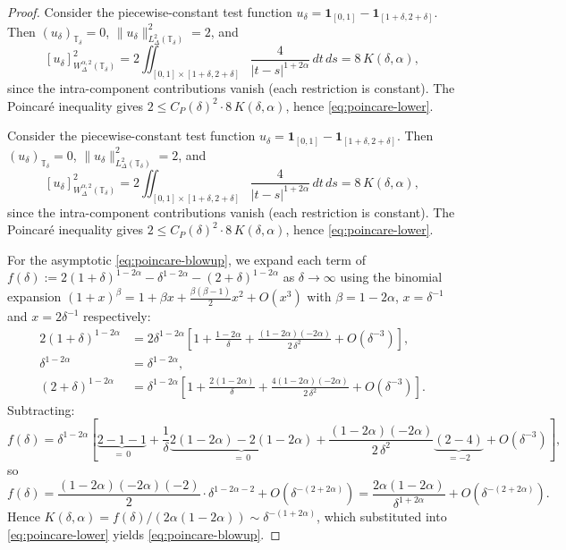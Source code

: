 \documentclass[11pt,a4paper]{article}
\numberwithin{equation}{section}
\theoremstyle{definition}
\newcommand{\T}{\mathbb{T}}
\begin{document}
\begin{proof}
Consider the piecewise-constant test function
$u_\delta = \mathbf{1}_{[0,1]} - \mathbf{1}_{[1+\delta,2+\delta]}$.
Then $(u_\delta)_{\T_\delta}=0$,
$\|u_\delta\|^2_{L^2_\Delta(\T_\delta)}=2$, and
\[
[u_\delta]^2_{W^{\alpha,2}_\Delta(\T_\delta)}
= 2\iint_{[0,1]\times[1+\delta,2+\delta]}
\frac{4}{|t-s|^{1+2\alpha}}\,dt\,ds
= 8\,K(\delta,\alpha),
\]
since the intra-component contributions vanish (each
restriction is constant). The Poincar\'e inequality gives
$2 \le C_P(\delta)^2 \cdot 8\,K(\delta,\alpha)$, hence
\eqref{eq:poincare-lower}.

Consider the piecewise-constant test function
$u_\delta = \mathbf{1}_{[0,1]} - \mathbf{1}_{[1+\delta,2+\delta]}$.
Then $(u_\delta)_{\T_\delta}=0$,
$\|u_\delta\|^2_{L^2_\Delta(\T_\delta)}=2$, and
\[
[u_\delta]^2_{W^{\alpha,2}_\Delta(\T_\delta)}
= 2\iint_{[0,1]\times[1+\delta,2+\delta]}
\frac{4}{|t-s|^{1+2\alpha}}\,dt\,ds
= 8\,K(\delta,\alpha),
\]
since the intra-component contributions vanish (each
restriction is constant). The Poincar\'e inequality gives
$2 \le C_P(\delta)^2 \cdot 8\,K(\delta,\alpha)$, hence
\eqref{eq:poincare-lower}.

For the asymptotic \eqref{eq:poincare-blowup}, we expand each term of
$f(\delta):=2(1+\delta)^{1-2\alpha}-\delta^{1-2\alpha}-(2+\delta)^{1-2\alpha}$
as $\delta\to\infty$ using the binomial expansion
$(1+x)^\beta = 1 + \beta x + \tfrac{\beta(\beta-1)}{2}x^2 + O(x^3)$
with $\beta=1-2\alpha$, $x=\delta^{-1}$ and $x=2\delta^{-1}$ respectively:
\begin{align*}
2(1+\delta)^{1-2\alpha}
&= 2\delta^{1-2\alpha}
  \!\left[1 + \frac{1-2\alpha}{\delta}
   + \frac{(1-2\alpha)(-2\alpha)}{2\,\delta^2}
   + O(\delta^{-3})\right],\\
\delta^{1-2\alpha}
&= \delta^{1-2\alpha},\\
(2+\delta)^{1-2\alpha}
&= \delta^{1-2\alpha}
  \!\left[1 + \frac{2(1-2\alpha)}{\delta}
   + \frac{4(1-2\alpha)(-2\alpha)}{2\,\delta^2}
   + O(\delta^{-3})\right].
\end{align*}
Subtracting:
\[
f(\delta)
= \delta^{1-2\alpha}
\left[
  \underbrace{2-1-1}_{=\,0}
  + \frac{1}{\delta}\underbrace{2(1-2\alpha)-2(1-2\alpha)}_{=\,0}
  + \frac{(1-2\alpha)(-2\alpha)}{2\,\delta^2}
    \underbrace{(2 - 4)}_{=-2}
  + O(\delta^{-3})
\right],
\]
so
\[
f(\delta)
= \frac{(1-2\alpha)(-2\alpha)(-2)}{2}\cdot\delta^{1-2\alpha-2}
  + O(\delta^{-(2+2\alpha)})
= \frac{2\alpha(1-2\alpha)}{\delta^{1+2\alpha}}
  + O(\delta^{-(2+2\alpha)}).
\]
Hence $K(\delta,\alpha)=f(\delta)/(2\alpha(1-2\alpha))\sim\delta^{-(1+2\alpha)}$,
which substituted into \eqref{eq:poincare-lower} yields \eqref{eq:poincare-blowup}.
\end{proof}
\end{document}
